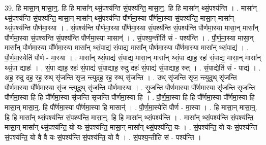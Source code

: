 \documentclass[17pt]{extarticle}
\begin{document}
39. हि मासा॒न् मासा॒न्॒. हि हि मासा᳚न् थ्सं॒पश्य॑न्ति सं॒पश्य॑न्ति॒ मासा॒न्॒. हि हि मासा᳚न् थ्सं॒पश्य॑न्ति । . मासा᳚न् थ्सं॒पश्य॑न्ति सं॒पश्य॑न्ति॒ मासा॒न् मासा᳚न् थ्सं॒पश्य॑न्ति पौर्णमा॒स्या पौ᳚र्णमा॒स्या सं॒पश्य॑न्ति॒ मासा॒न् मासा᳚न् थ्सं॒पश्य॑न्ति पौर्णमा॒स्या । . सं॒पश्य॑न्ति पौर्णमा॒स्या पौ᳚र्णमा॒स्या सं॒पश्य॑न्ति सं॒पश्य॑न्ति पौर्णमा॒स्या मासा॒न् मासा᳚न् पौर्णमा॒स्या सं॒पश्य॑न्ति सं॒पश्य॑न्ति पौर्णमा॒स्या मासान्॑ । . सं॒पश्य॒न्तीति॑ सं - पश्य॑न्ति । . पौ॒र्ण॒मा॒स्या मासा॒न् मासा᳚न् पौर्णमा॒स्या पौ᳚र्णमा॒स्या मासा᳚न् थ्सं॒पाद्य॑ सं॒पाद्य॒ मासा᳚न् पौर्णमा॒स्या पौ᳚र्णमा॒स्या मासा᳚न् थ्सं॒पाद्य॑ । . पौ॒र्ण॒मा॒स्येति॑ पौर्ण - मा॒स्या । . मासा᳚न् थ्सं॒पाद्य॑ सं॒पाद्य॒ मासा॒न् मासा᳚न् थ्सं॒पा द्याह॒ रहः॑ सं॒पाद्य॒ मासा॒न् मासा᳚न् थ्सं॒पा द्याहः॑ । . सं॒पा द्याह॒ रहः॑ सं॒पाद्य॑ सं॒पाद्याह॒ रुदु दहः॑ सं॒पाद्य॑ सं॒पाद्याह॒ रुत् । . सं॒पाद्येति॑ सं - पाद्य॑ । . अह॒ रुदु दह॒ रह॒ रुथ् सृ॑जन्ति सृज॒ न्त्युदह॒ रह॒ रुथ् सृ॑जन्ति । . उथ् सृ॑जन्ति सृज॒ न्त्युदुथ् सृ॑जन्ति पौर्णमा॒स्या पौ᳚र्णमा॒स्या सृ॑ज॒ न्त्युदुथ् सृ॑जन्ति पौर्णमा॒स्या । . सृ॒ज॒न्ति॒ पौ॒र्ण॒मा॒स्या पौ᳚र्णमा॒स्या सृ॑जन्ति सृजन्ति पौर्णमा॒स्या हि हि पौ᳚र्णमा॒स्या सृ॑जन्ति सृजन्ति पौर्णमा॒स्या हि । . पौ॒र्ण॒मा॒स्या हि हि पौ᳚र्णमा॒स्या पौ᳚र्णमा॒स्या हि मासा॒न् मासा॒न्॒. हि पौ᳚र्णमा॒स्या पौ᳚र्णमा॒स्या हि मासान्॑ । . पौ॒र्ण॒मा॒स्येति॑ पौर्ण - मा॒स्या । . हि मासा॒न् मासा॒न्॒. हि हि मासा᳚न् थ्सं॒पश्य॑न्ति सं॒पश्य॑न्ति॒ मासा॒न्॒. हि हि मासा᳚न् थ्सं॒पश्य॑न्ति । . मासा᳚न् थ्सं॒पश्य॑न्ति सं॒पश्य॑न्ति॒ मासा॒न् मासा᳚न् थ्सं॒पश्य॑न्ति॒ यो यः सं॒पश्य॑न्ति॒ मासा॒न् मासा᳚न् थ्सं॒पश्य॑न्ति॒ यः । . सं॒पश्य॑न्ति॒ यो यः सं॒पश्य॑न्ति सं॒पश्य॑न्ति॒ यो वै वै यः सं॒पश्य॑न्ति सं॒पश्य॑न्ति॒ यो वै । . सं॒पश्य॒न्तीति॑ सं - पश्य॑न्ति । \newline
\end{document}
